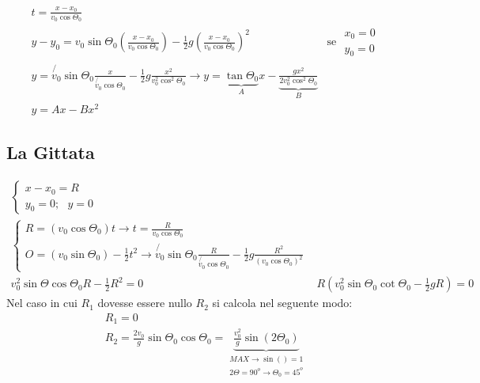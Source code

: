 \documentclass{article}
\begin{document}
\begin{eqnarray}
  \label{eq:eqtrai}
  t=\frac{x-x_0}{v_0\cos\Theta_0}\\
  y-y_0=v_0\sin\Theta_0\left(\frac{x-x_0}{v_0\cos\Theta_0}\right)-\frac{1}{2}g\left(\frac{x-x_0}{v_0\cos\Theta_0}\right)^2& \text{se }
                                                                                                                            \begin{matrix}
                                                                                                                              x_0=0\\
                     y_0=0
                                                                                                                            \end{matrix}\\
  y=\not{v_0}\sin\Theta_0\frac{x}{\not{v_0}\cos\Theta_0}-\frac{1}{2}g\frac{x^2}{v^2_0\cos^2\Theta_0}\to y=\underbrace{\tan\Theta_0}_Ax-\underbrace{\frac{gx^2}{2v_0^2\cos^2\Theta{}_0}}_B\\
  y=Ax-Bx^2
\end{eqnarray}

\subsection{La Gittata}
\label{sec:gittata}

\begin{eqnarray}
  \label{eq:gittata}
  \begin{cases}
    x-x_0=R\\
    y_0=0;\text{ }y=0
  \end{cases}\\
  \begin{cases}
    R=(v_0\cos\Theta_0)t\to t =\frac{R}{v_0\cos\Theta{}_0}\\
    O=(v_0\sin\Theta{}_0)-\frac{1}{2}t^2\to \not{v_0}\sin\Theta_0\frac{R}{\not{v_0}\cos\Theta_0}-\frac{1}{2}g\frac{R^2}{(v_0\cos\Theta_0)^2}
  \end{cases}\\
  v_0^2\sin\Theta{}\cos\Theta{}_0R-\frac{1}{2}R^2=0 & R\left(v_0^2\sin\Theta{}_0\cot\Theta{}_0-\frac{1}{2}gR\right)=0
\end{eqnarray}
Nel caso in cui $R_1$ dovesse essere nullo $R_2$ si calcola nel seguente modo:
\begin{eqnarray}
  \label{eq:R1=0}
  R_1=0\\
  R_2=\frac{2v_0}{g} \sin\Theta{}_0\cos\Theta{}_0=\underbrace{\frac{v_0^2}{g}\sin(2\Theta{}_0)}_{
  \begin{matrix}
    MAX\to \sin()=1\\
    2\Theta{}=90^o\to \Theta{}_0=45^o
  \end{matrix}
  }
\end{eqnarray}
\end{document}
